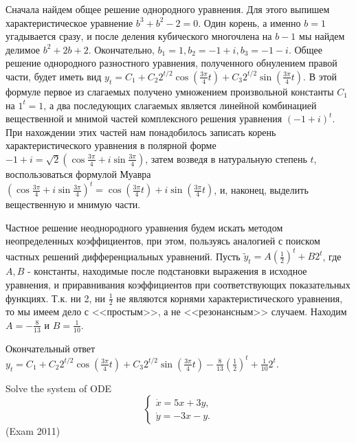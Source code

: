 \begin{solution}
Сначала найдем общее решение однородного уравнения. Для этого выпишем характеристическое уравнение $b^{3} +b^{2} -2=0$. Один корень, а именно $b=1$ угадывается сразу, и после деления кубического многочлена на $b-1$ мы найдем делимое $b^{2} +2b+2$. Окончательно, $b_{1} =1, b_{2} =-1+i, b_{3} =-1-i$. Общее решение однородного разностного уравнения, полученного обнулением правой части, будет иметь вид $y_{t} =C_{1} +C_{2} 2^{t/2} \cos (\frac{3\pi }{4} t)+C_{3} 2^{t/2} \sin (\frac{3\pi }{4} t)$. В этой формуле первое из слагаемых получено умножением произвольной константы $C_{1} $ на $1^{t} =1$, а два последующих слагаемых является линейной комбинацией вещественной и мнимой частей комплексного решения уравнения $(-1+i)^{t} $. При нахождении этих частей нам понадобилось записать корень характеристического уравнения в полярной форме $-1+i=\sqrt{2} (\cos \frac{3\pi }{4} +i\sin \frac{3\pi }{4} )$, затем возведя в натуральную степень $t$, воспользоваться формулой Муавра $(\cos \frac{3\pi }{4} +i\sin \frac{3\pi }{4} )^{t} =\cos (\frac{3\pi }{4} t)+i\sin (\frac{3\pi }{4} t)$, и, наконец, выделить вещественную и мнимую части.

Частное решение неоднородного уравнения будем искать методом неопределенных коэффициентов, при этом, пользуясь аналогией с поиском частных решений дифференциальных уравнений. Пусть $\tilde{y}_{t} =A(\frac{1}{2} )^{t} +B2^{t} $, где $A, B$ - константы, находимые после подстановки выражения в исходное уравнения, и приравнивания коэффициентов при соответствующих показательных функциях. Т.к. ни 2, ни $\frac{1}{2} $ не являются корнями характеристического уравнения, то мы имеем дело с <<простым>>, а не <<резонансным>> случаем. Находим $A=-\frac{8}{13} $ и $B=\frac{1}{10} $.

Окончательный ответ $y_{t} =C_{1} +C_{2} 2^{t/2} \cos (\frac{3\pi }{4} t)+C_{3} 2^{t/2} \sin (\frac{3\pi }{4} t)-\frac{8}{13} (\frac{1}{2} )^{t} +\frac{1}{10} 2^{t} $.
\end{solution}


\begin{problem}
Solve the system of ODE  
\[
\begin{cases} 
\dot{x}=5x+3y, \\ 
\dot{y}=-3x-y.
\end{cases} 
\]
(Exam 2011)
\end{problem}

